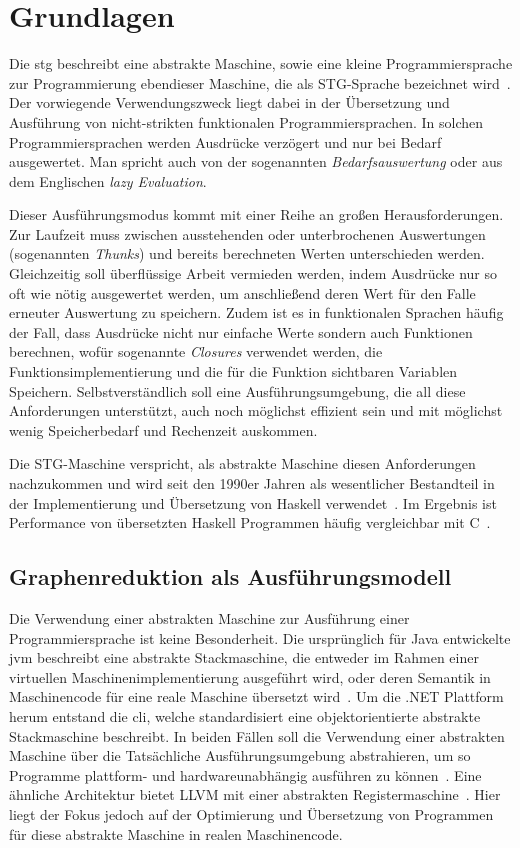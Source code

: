 
\chapter{Grundlagen}\label{chap:grundlagen}

Die \gls{stg} beschreibt eine abstrakte Maschine, sowie eine kleine Programmiersprache zur Programmierung ebendieser Maschine, die als STG-Sprache bezeichnet wird~\cite{Jones_StockHardwareSTG}.
Der vorwiegende Verwendungszweck liegt dabei in der Übersetzung und Ausführung von nicht-strikten funktionalen Programmiersprachen.
In solchen Programmiersprachen werden Ausdrücke verzögert und nur bei Bedarf ausgewertet.
Man spricht auch von der sogenannten \textit{Bedarfsauswertung} oder aus dem Englischen \textit{lazy Evaluation}.

Dieser Ausführungsmodus kommt mit einer Reihe an großen Herausforderungen.
Zur Laufzeit muss zwischen ausstehenden oder unterbrochenen Auswertungen (sogenannten \textit{Thunks}) und bereits berechneten Werten unterschieden werden.
Gleichzeitig soll überflüssige Arbeit vermieden werden, indem Ausdrücke nur so oft wie nötig ausgewertet werden, um anschließend deren Wert für den Falle erneuter Auswertung zu speichern.
Zudem ist es in funktionalen Sprachen häufig der Fall, dass Ausdrücke nicht nur einfache Werte sondern auch Funktionen berechnen, wofür sogenannte \textit{Closures} verwendet werden, die Funktionsimplementierung und die für die Funktion sichtbaren Variablen Speichern.
Selbstverständlich soll eine Ausführungsumgebung, die all diese Anforderungen unterstützt, auch noch möglichst effizient sein und mit möglichst wenig Speicherbedarf und Rechenzeit auskommen.

Die STG-Maschine verspricht, als abstrakte Maschine diesen Anforderungen nachzukommen und wird seit den 1990er Jahren als wesentlicher Bestandteil in der Implementierung und Übersetzung von Haskell verwendet~\cite{Bolingbroke_WhatIsSTG}.
Im Ergebnis ist Performance von übersetzten Haskell Programmen häufig vergleichbar mit C~\cite{PeytonJones_FastCurry}.


\section{Graphenreduktion als Ausführungsmodell}

Die Verwendung einer abstrakten Maschine zur Ausführung einer Programmiersprache ist keine Besonderheit.
Die ursprünglich für Java entwickelte \gls{jvm} beschreibt eine abstrakte Stackmaschine, die entweder im Rahmen einer virtuellen Maschinenimplementierung ausgeführt wird, oder deren Semantik in Maschinencode für eine reale Maschine übersetzt wird~\cite{JVM17}.
Um die .NET Plattform herum entstand die \gls{cli}, welche standardisiert eine objektorientierte abstrakte Stackmaschine beschreibt.
In beiden Fällen soll die Verwendung einer abstrakten Maschine über die Tatsächliche Ausführungsumgebung abstrahieren, um so Programme plattform- und hardwareunabhängig ausführen zu können~\cite{Miller_CommonLanguageInfrastructure}.
Eine ähnliche Architektur bietet LLVM mit einer abstrakten Registermaschine~\cite{LLVM}.
Hier liegt der Fokus jedoch auf der Optimierung und Übersetzung von Programmen für diese abstrakte Maschine in realen Maschinencode.

